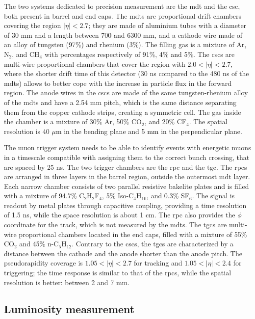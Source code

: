 The two systems dedicated to precision measurement are the \gls{mdt} and the \gls{csc}, both present in barrel and end caps. The \glspl{mdt} are proportional drift chambers covering the region $|\eta|<2.7$; they are made of aluminium tubes with a diameter of 30 mm and a length between 700 and 6300 mm, and a cathode wire made of an alloy of tungsten (97\%) and rhenium (3\%). The filling gas is a mixture of Ar, N$_2$, and CH$_4$ with percentages respectively of 91\%, 4\% and 5\%. The \glspl{csc} are multi-wire proportional chambers that cover the region with $2.0<|\eta|<2.7$, where the shorter drift time of this detector (30 ns compared to the 480 ns of the \glspl{mdt}) allows to better cope with the increase in particle flux in the forward region. The anode wires in the \glspl{csc} are made of the same tungsten-rhenium alloy of the \glspl{mdt} and have a 2.54 mm pitch, which is the same distance separating them from the copper cathode strips, creating a symmetric cell. The gas inside the chamber is a mixture of 30\% Ar, 50\% CO$_2$, and 20\% CF$_4$. The spatial resolution is 40 $\mu$m in the bending plane and 5 mm in the perpendicular plane.

The muon trigger system needs to be able to identify events with energetic muons in a timescale compatible with assigning them to the correct bunch crossing, that are spaced by 25 ns. The two trigger chambers are the \gls{rpc} and the \gls{tgc}. The \glspl{rpc} are arranged in three layers in the barrel region, outside the outermost \gls{mdt} layer. Each narrow chamber consists of two parallel resistive bakelite plates and is filled with a mixture of 94.7\% C$_2$H$_2$F$_4$, 5\% Iso-C$_4$H$_{10}$, and 0.3\% SF$_6$. The signal is readout by metal plates through capacitive coupling, providing a time resolution of 1.5 ns, while the space resolution is about 1 cm. The \gls{rpc} also provides the $\phi$ coordinate for the track, which is not measured by the \glspl{mdt}. The \glspl{tgc} are multi-wire proportional chambers located in the end caps, filled with a mixture of 55\% CO$_2$ and 45\% n-C$_5$H$_{12}$. Contrary to the \glspl{csc}, the \glspl{tgc} are characterized by a distance between the cathode and the anode shorter than the anode pitch. The pseudorapidity coverage is $1.05<|\eta|<2.7$ for tracking and $1.05<|\eta|<2.4$ for triggering; the time response is similar to that of the \glspl{rpc}, while the spatial resolution is better: between 2 and 7 mm. 

\subsection{Luminosity measurement}
\label{sec:lumimeas}

